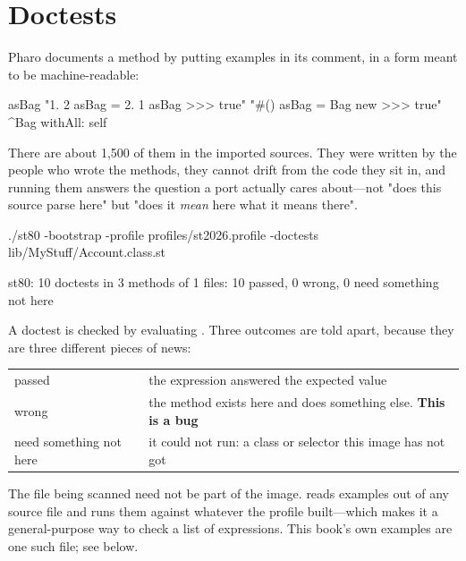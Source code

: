 \section{Doctests}

Pharo documents a method by putting examples in its comment, in a form meant
to be machine-readable:

\begin{st}
asBag
	"{1. 2} asBag = {2. 1} asBag >>> true"
	"#() asBag = Bag new >>> true"
	^Bag withAll: self
\end{st}

There are about 1,500 of them in the imported sources. They were written by
the people who wrote the methods, they cannot drift from the code they sit in,
and running them answers the question a port actually cares about---not "does
this source parse here" but "does it \emph{mean} here what it means there".

\begin{sh}
./st80 -bootstrap -profile profiles/st2026.profile -doctests lib/MyStuff/Account.class.st
\end{sh}

\begin{plain}
st80: 10 doctests in 3 methods of 1 files: 10 passed, 0 wrong,
      0 need something not here
\end{plain}

A doctest is checked by evaluating . Three
outcomes are told apart, because they are three different pieces of news:

\begin{center}
\small
\begin{tabular}{@{}lp{}@{}}
\toprule
passed & the expression answered the expected value\\
wrong & the method exists here and does something else. \textbf{This is a
  bug}\\
need something not here & it could not run: a class or selector this image has
  not got\\
\bottomrule
\end{tabular}
\end{center}

\begin{stnote}
The file being scanned need not be part of the image.  reads
examples out of any source file and runs them against whatever the profile
built---which makes it a general-purpose way to check a list of expressions.
This book's own examples are one such file; see below.
\end{stnote}

